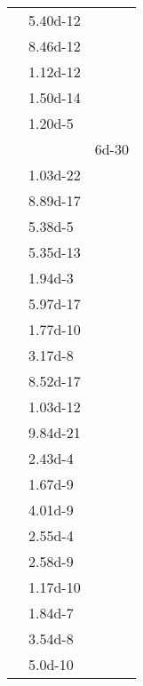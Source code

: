 \documentclass[a4paper, 10pt]{article}
\begin{document}
\begin{small}
    \begin{supertabular}{lll}
                     & \num{5.40d-12}  & \\
                      & \num{8.46d-12}  & \\
                     & \num{1.12d-12}  & \\
                      & \num{1.50d-14}  & \\
                      & \num{1.20d-5}   & \\
                        &                 & \num{6d-30} \\
                     & \num{1.03d-22}  & \\
                      & \num{8.89d-17}  & \\
                      & \num{5.38d-5}   & \\
                        & \num{5.35d-13}  & \\
                    & \num{1.94d-3}   & \\
                        & \num{5.97d-17}  & \\
                        & \num{1.77d-10}  & \\
                       & \num{3.17d-8}   & \\
                         & \num{8.52d-17}  & \\
                       & \num{1.03d-12}  & \\
                       & \num{9.84d-21}  & \\
                   & \num{2.43d-4}   & \\
                & \num{1.67d-9}   & \\
                    & \num{4.01d-9}   & \\
                & \num{2.55d-4}   & \\
                       & \num{2.58d-9}   & \\
                      & \num{1.17d-10}  & \\
                        & \num{1.84d-7}   & \\
                      & \num{3.54d-8}   & \\
                       & \num{5.0d-10}   & \\

\end{supertabular}
\end{small}
\end{document}
